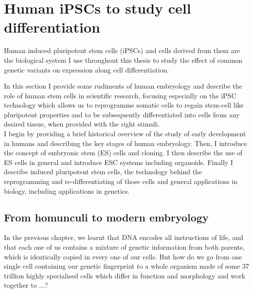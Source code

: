\section{Human iPSCs to study cell differentiation}  %

Human induced pluripotent stem cells (iPSCs) and cells derived from them are the biological system I use throughout this thesis to study the effect of common genetic variants on expression along cell differentiation.

In this section I provide some rudiments of human embryology and describe the role of human stem cells in scientific research, focusing especially on the iPSC technology which allows us to reprogramme somatic cells to regain stem-cell like pluripotent properties and to be subsequently differentiated into cells from any desired tissue, when provided with the right stimuli.\\

I begin by providing a brief historical overview of the study of early development in humans and describing the key stages of human embryology.
Then, I introduce the concept of embryonic stem (ES) cells and cloning.
I then describe the use of ES cells in general and introduce ESC systems including organoids.
Finally I describe induced pluripotent stem cells, the technology behind the reprogramming and re-differentiating of those cells and general applications in biology, including applications in genetics.

\subsection{From homunculi to modern embryology}

In the previous chapter, we learnt that DNA encodes all instructions of life, and that each one of us contains a mixture of genetic information from both parents, which is identically copied in every one of our cells.
But how do we go from one single cell containing our genetic fingerprint to a whole organism made of some 37 trillion highly specialised cells which differ in function and morphology and work together to ...?\\

